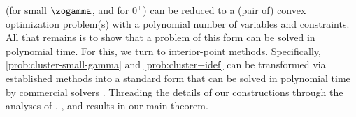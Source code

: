(for small $\zogamma$, and for $0^+$)
%
can be reduced to a (pair of) convex optimization problem(s) with a
polynomial number of variables and constraints.
All that remains 
is to show that a problem of this form can be solved in polynomial time.
For this, we turn to interior-point methods.
Specifically, \eqref{prob:cluster-small-gamma} and \eqref{prob:cluster+idef} can be transformed via established methods \parencite{agrawal2018rewriting} into
a standard form
that
can be solved in polynomial time by commercial solvers \parencite{mosek,ECOS}.
Threading the details of our constructions through
the analyses of \textcite{dahl2022primal}, \textcite{skajaa2015homogeneous}, and \textcite{nesterov1996infeasible}
results in our main theorem.




